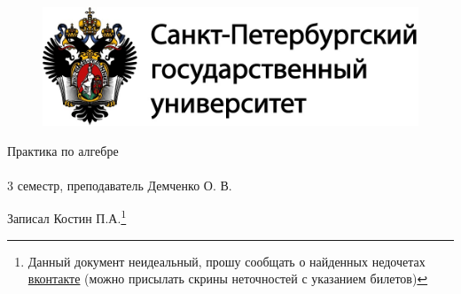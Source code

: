 \documentclass[main]{subfiles}
\begin{document}
	\begin{figure}[H]
			\includegraphics[width=12cm]{../../../template/spsu.jpg}
			\centering
	\end{figure}
	\vspace*{\fill}
	\begin{center}
		\huge Практика по алгебре\\ \ \\
		\Large 3 семестр, преподаватель Демченко О. В.

		\large Записал Костин П.А.\footnote{Данный документ неидеальный, прошу сообщать о найденных недочетах \href{https://vk.com/drab_existence_a}{вконтакте} (можно присылать скрины неточностей с указанием билетов)}
	\end{center}
	\vspace*{\fill}
	\vspace*{\fill}

	\newpage
	\tableofcontents
	\newpage
\end{document}
